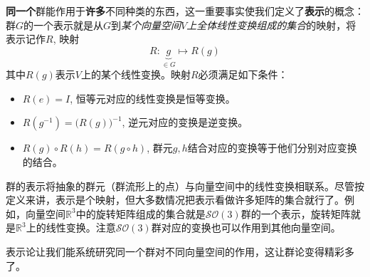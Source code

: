{\bfseries 同一个}群能作用于{\bfseries 许多}不同种类的东西，这一重要事实使我们定义了{\bfseries 表示}的概念：群$G$的一个表示就是从$G$到{\itshape 某个向量空间$V$上全体线性变换组成的集合}的映射，将表示记作$R$, 映射
\begin{equation}
\label{equ3.86}
R: \underbrace{g}_{\in G} \mapsto R(g)
\end{equation}
其中$R(g)$表示$V$上的某个线性变换。映射$R$必须满足如下条件：
\begin{itemize}
	\item $R(e) = I$, 恒等元对应的线性变换是恒等变换。
	\item $R(g^{-1}) = \big( R(g) \big)^{-1}$, 逆元对应的变换是逆变换。
	\item $R(g) \circ R(h) = R(g \circ h)$, 群元$g,h$结合对应的变换等于他们分别对应变换的结合。
\end{itemize}

群的表示将抽象的群元（群流形上的点）与向量空间中的线性变换相联系。尽管按定义来讲，表示是个映射，但大多数情况把表示看做许多矩阵的集合就行了。例如，向量空间$\mathbb{R}^3$中的旋转矩阵组成的集合就是$\mathcal{SO}(3)$群的一个表示，旋转矩阵就是$\mathbb{R}^3$上的线性变换。注意$\mathcal{SO}(3)$群对应的变换也可以作用到其他向量空间。

表示论让我们能系统研究同一个群对不同向量空间的作用，这让群论变得精彩多了。

